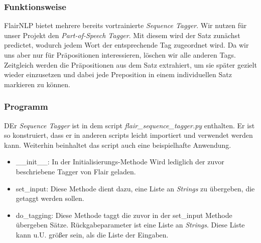 \documentclass[10pt,a4paper]{article}
\begin{document}
\subsubsection{Funktionsweise}
\begin{flushleft}
FlairNLP bietet mehrere bereits vortrainierte \textit{Sequence Tagger}. Wir nutzen für unser Projekt den \textit{Part-of-Speech Tagger}. Mit diesem wird der Satz zunächst predictet, wodurch jedem Wort der entsprechende Tag zugeordnet wird. Da wir uns aber nur für Präpositionen interessieren, löschen wir alle anderen Tags. Zeitgleich werden die Präpositionen aus dem Satz extrahiert, um sie später gezielt wieder einzusetzen und dabei jede Preposition in einem individuellen Satz markieren zu können.
\end{flushleft}

\subsubsection{Programm}
\begin{flushleft}
DEr \textit{Sequence Tagger} ist in dem script \textit{flair\_sequence\_tagger.py} enthalten. Er ist so konstruiert, dass er in anderen scripts leicht importiert und verwendet werden kann. Weiterhin beinhaltet das script auch eine beispielhafte Anwendung.
\end{flushleft}
\begin{itemize}
\item \_\_init\_\_: In der Initialisierungs-Methode Wird lediglich der zuvor beschriebene Tagger von Flair geladen.
\item set\_input: Diese Methode dient dazu, eine Liste an \textit{Strings} zu übergeben, die getaggt werden sollen.
\item do\_tagging: Diese Methode taggt die zuvor in der set\_input Methode übergeben Sätze. Rückgabeparameter ist eine Liste an \textit{Strings}. Diese Liste kann u.U. größer sein, als die Liste der Eingaben.
\end{itemize}
\end{document}
